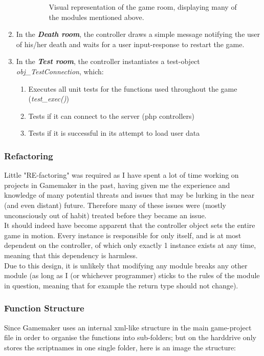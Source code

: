 \documentclass[12pt]{report}
\begin{document}
\begin{enumerate}
\begin{enumerate}
\begin{figure}[h]
\centering
{}
\caption{Visual representation of the game room, displaying many of the modules mentioned above.}
\end{figure}

\end{enumerate}
\item In the \emph{\textbf{Death room}}, the controller draws a simple message notifying the user of his/her death and waits for a user input-response to restart the game.
\item In the \emph{\textbf{Test room}}, the controller instantiates a test-object \emph{obj\_TestConnection}, which:
\begin{enumerate}
\item Executes all unit tests for the functions used throughout the game (\emph{test\_exec()})
\item Tests if it can connect to the server (php controllers)
\item Tests if it is successful in its attempt to load user data
\end{enumerate}
\end{enumerate}
\subsubsection{Refactoring}
Little "RE-factoring" was required as I have spent a lot of time working on projects in Gamemaker in the past, having given me the experience and knowledge of many potential threats and issues that may be lurking in the near (and even distant) future. Therefore many of these issues were (mostly unconsciously out of habit) treated before they became an issue.\\
It should indeed have become apparent that the controller object sets the entire game in motion. Every instance is responsible for only itself, and is at most dependent on the controller, of which only exactly 1 instance exists at any time, meaning that this dependency is harmless.\\
Due to this design, it is unlikely that modifying any module breaks any other module (as long as I (or whichever programmer) sticks to the rules of the module in question, meaning that for example the return type should not change).\\

\subsubsection{Function Structure}
Since Gamemaker uses an internal xml-like structure in the main game-project file in order to organise the functions into sub-folders; but on the harddrive only stores the scriptnames in one single folder, here is an image the structure:
\end{document}
